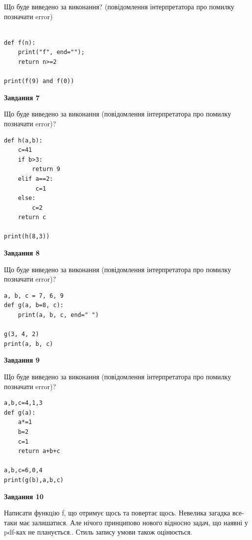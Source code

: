 \documentclass[12pt, ukrainian]{article}
\begin{document}
{\begin {large}
Що буде виведено за виконання? (повідомлення інтерпретатора про помилку позначати error)\par
\begin{verbatim}

def f(n):
    print("f", end="");
    return n>=2

print(f(9) and f(0))
\end{verbatim}

{\begin {center}\textbf{Завдання 7}\end {center}}

Що буде виведено за виконання (повідомлення інтерпретатора про помилку позначати error)?\par
\begin{verbatim}
def h(a,b):
    c=41
    if b>3:
        return 9
    elif a==2:
         c=1
    else: 
        c=2
    return c

print(h(8,3))
\end{verbatim}

{\begin {center}\textbf{Завдання 8}\end {center}}

Що буде виведено за виконання (повідомлення інтерпретатора про помилку позначати error)?\par
\begin{verbatim}
a, b, c = 7, 6, 9
def g(a, b=8, c):
    print(a, b, c, end=" ")

g(3, 4, 2)
print(a, b, c)
\end{verbatim}

{\begin {center}\textbf{Завдання 9}\end {center}}

Що буде виведено за виконання (повідомлення інтерпретатора про помилку позначати error)?\par
\begin{verbatim}
a,b,c=4,1,3
def g(a):
    a*=1
    b=2
    c=1
    return a+b+c

a,b,c=6,0,4
print(g(b),a,b,c)
\end{verbatim}

{\begin {center}\textbf{Завдання 10}\end {center}}


Написати функцiю f, що отримує щось та повертає щось. Невелика загадка все-таки має залишатися. Але нічого принципово нового відносно задач, що наявні у pdf-ках не планується.. Стиль запису умови також оцінюється.\par
\end {large}}
\newpage
\end{document}
